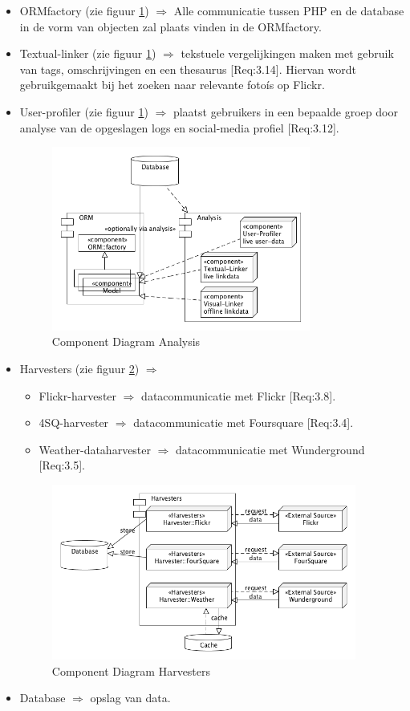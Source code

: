 \documentclass[a4paper,10pt]{article}
\begin{document}
\begin{itemize}
			\item ORMfactory (zie figuur \ref{componentdiagramanalysis}) $\Rightarrow$ Alle communicatie tussen PHP en de database in de vorm van objecten zal plaats vinden in de ORMfactory.
			\item Textual-linker (zie figuur \ref{componentdiagramanalysis}) $\Rightarrow$ tekstuele vergelijkingen maken met gebruik van tags, omschrijvingen en een thesaurus [Req:3.14]. Hiervan wordt gebruikgemaakt bij het zoeken naar relevante fotoís op Flickr.
			\item User-profiler (zie figuur \ref{componentdiagramanalysis}) $\Rightarrow$ plaatst gebruikers in een bepaalde groep door analyse van de opgeslagen logs en social-media profiel [Req:3.12].
				\begin{figure}[ht!]
				\centering
				\includegraphics[width=8.5cm]{componentDiagram_analysis.png}
				\caption{Component Diagram Analysis \label{componentdiagramanalysis}}
				\end{figure}
			\item Harvesters (zie figuur \ref{componentdiagramharvesters}) $\Rightarrow$
				\begin{itemize}
					\item Flickr-harvester $\Rightarrow$ datacommunicatie met Flickr [Req:3.8].
					\item 4SQ-harvester $\Rightarrow$ datacommunicatie met Foursquare [Req:3.4].
					\item Weather-dataharvester $\Rightarrow$ datacommunicatie met Wunderground [Req:3.5]. 
				\end{itemize}
				\begin{figure}[ht!]
				\centering
				\includegraphics[width=10cm]{componentDiagram_harvesters.png}
				\caption{Component Diagram Harvesters \label{componentdiagramharvesters}}
				\end{figure}
			\item Database $\Rightarrow$ opslag van data.	
		\end{itemize}
		
\end{document}
